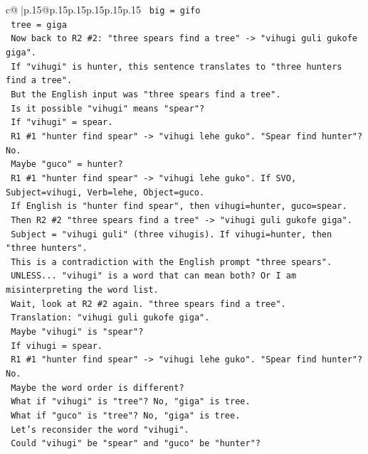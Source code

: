 \documentclass{article}
\begin{document}
{\begin{supertabular}{c@{$\;$}|p{.15\linewidth}@{}p{.15\linewidth}p{.15\linewidth}p{.15\linewidth}p{.15\linewidth}p{.15\linewidth}}
{{{\texttt{   big = gifo} \\
\texttt{   tree = giga} \\
\texttt{   Now back to R2 \#2: "three spears find a tree" {-}> "vihugi guli gukofe giga".} \\
\texttt{   If "vihugi" is hunter, this sentence translates to "three hunters find a tree".} \\
\texttt{   But the English input was "three spears find a tree".} \\
\texttt{   Is it possible "vihugi" means "spear"?} \\
\texttt{   If "vihugi" = spear.} \\
\texttt{   R1 \#1 "hunter find spear" {-}> "vihugi lehe guko". "Spear find hunter"? No.} \\
\texttt{   Maybe "guco" = hunter?} \\
\texttt{   R1 \#1 "hunter find spear" {-}> "vihugi lehe guko". If SVO, Subject=vihugi, Verb=lehe, Object=guco.} \\
\texttt{   If English is "hunter find spear", then vihugi=hunter, guco=spear.} \\
\texttt{   Then R2 \#2 "three spears find a tree" {-}> "vihugi guli gukofe giga".} \\
\texttt{   Subject = "vihugi guli" (three vihugis). If vihugi=hunter, then "three hunters".} \\
\texttt{   This is a contradiction with the English prompt "three spears".} \\
\texttt{   UNLESS... "vihugi" is a word that can mean both? Or I am misinterpreting the word list.} \\
\texttt{   Wait, look at R2 \#2 again. "three spears find a tree".} \\
\texttt{   Translation: "vihugi guli gukofe giga".} \\
\texttt{   Maybe "vihugi" is "spear"?} \\
\texttt{   If vihugi = spear.} \\
\texttt{   R1 \#1 "hunter find spear" {-}> "vihugi lehe guko". "Spear find hunter"? No.} \\
\texttt{   Maybe the word order is different?} \\
\texttt{   What if "vihugi" is "tree"? No, "giga" is tree.} \\
\texttt{   What if "guco" is "tree"? No, "giga" is tree.} \\
\texttt{   Let's reconsider the word "vihugi".} \\
\texttt{   Could "vihugi" be "spear" and "guco" be "hunter"?} \\
}}}
\end{supertabular}}
\end{document}
